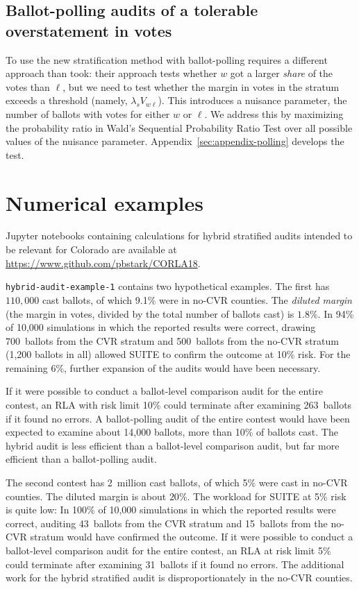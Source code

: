 \documentclass[runningheads]{llncs}
\begin{document}
\subsection{Ballot-polling audits of a tolerable overstatement in votes}
\label{sec:ballotPollError}

To use the new stratification method with ballot-polling requires a different approach than \cite{lindemanEtal12} took: their approach tests whether $w$ got a larger \emph{share} of the votes than $\ell$, but we need to test whether the margin in votes in the stratum exceeds a threshold (namely, $\lambda_s V_{w\ell}$).
This introduces a nuisance parameter, the number of ballots with votes for either $w$ or $\ell$.
We address this by maximizing the probability ratio in Wald's Sequential Probability Ratio Test 
\cite{wald45} over all possible values of the nuisance parameter.
Appendix~\ref{sec:appendix-polling} develops the test.

\section{Numerical examples}\label{sec:examples}

Jupyter notebooks containing calculations for hybrid stratified audits intended to be relevant for Colorado are available at \url{https://www.github.com/pbstark/CORLA18}.

\texttt{hybrid-audit-example-1} contains two hypothetical examples. 
The first has $110,000$ cast ballots, of which 
9.1\% were in no-CVR counties. 
The \emph{diluted margin} (the margin in votes, divided by the total number of ballots cast) is $1.8\%$.
In 94\% of 10,000 simulations in which
the reported results were correct, drawing 700~ballots from the CVR stratum and 500~ballots 
from the no-CVR stratum (1,200 ballots in all)
allowed SUITE to confirm the outcome at 10\% risk.
For the remaining 6\%, further expansion of the audits would have been necessary.

If it were possible to conduct a ballot-level comparison audit for the entire contest, 
an RLA with risk limit 10\% could terminate after examining 263~ballots if it found no errors.
A ballot-polling audit of the entire contest would have been expected to examine about 14,000 ballots, more than 10\% of ballots cast.
The hybrid audit is less efficient than a ballot-level comparison audit, but far more efficient than a ballot-polling audit.

The second contest has 2~million cast ballots, of which 5\% were cast in no-CVR counties.
The diluted margin is about $20\%$.
The workload for SUITE at 5\% risk is quite low:
In 100\% of 10,000 simulations in which
the reported results were correct, auditing 43~ballots from the 
CVR stratum and 15~ballots from the no-CVR stratum
would have confirmed the outcome.
If it were possible to conduct a ballot-level comparison audit for the entire contest, 
an RLA at risk limit 5\% could terminate after examining 31~ballots if it found no errors.
The additional work for the hybrid stratified audit is disproportionately in the no-CVR counties.
\end{document}
